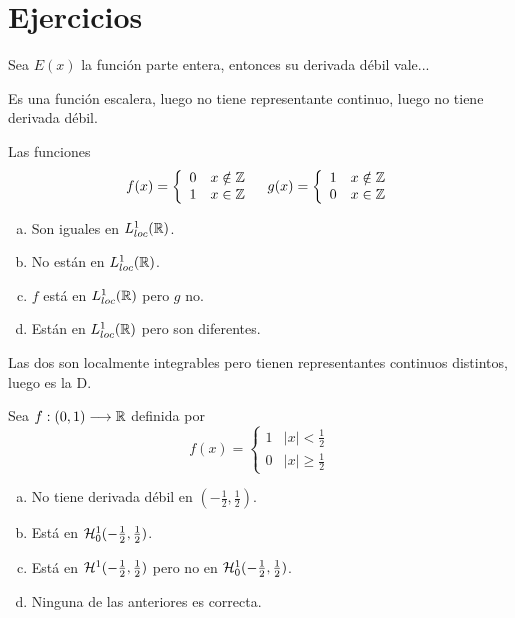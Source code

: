 \chapter{Ejercicios}
\begin{ejercicio}
Sea $E(x)$ la función parte entera, entonces su derivada débil vale...
\end{ejercicio}
Es una función escalera, luego no tiene representante continuo, luego no tiene derivada débil.

\begin{ejercicio}
Las funciones 
\[
f(x)=\left\{
\begin{array}{cc}
0 & x\notin \Z \\
1 & x\in \Z 
\end{array}
\right. \espacio 
g(x)=\left\{
\begin{array}{cc}
1 & x\notin \Z \\
0 & x\in \Z 
\end{array}
\right.
\]
\begin{enumerate}[(a)]
\item Son iguales en $L_{loc}^1(\R)$.
\item No están en $L_{loc}^1(\R)$.
\item $f$ está en $L_{loc}^1(\R)$  pero $g$ no.
\item Están en $L_{loc}^1(\R)$ pero son diferentes.
\end{enumerate}
\end{ejercicio}

Las dos son localmente integrables pero tienen representantes continuos distintos, luego es la D.

\begin{ejercicio}
Sea $\funcion{f}{(0,1)}{\R}$ definida por
\[
f(x)=\left\{
\begin{array}{cc}
1 & |x|<\frac{1}{2} \\
0 & |x|\geq \frac{1}{2} 
\end{array}
\right.
\]
\begin{enumerate}[(a)]
\item No tiene derivada débil en $\left(-\frac{1}{2},\frac{1}{2}\right)$.
\item Está en $\sobolevcero[-\frac{1}{2},\frac{1}{2}]{1}$.
\item Está en $\sobolev[-\frac{1}{2},\frac{1}{2}]{1}$ pero no en $\sobolevcero[-\frac{1}{2},\frac{1}{2}]{1}$.
\item Ninguna de las anteriores es correcta.
\end{enumerate}
\end{ejercicio}

